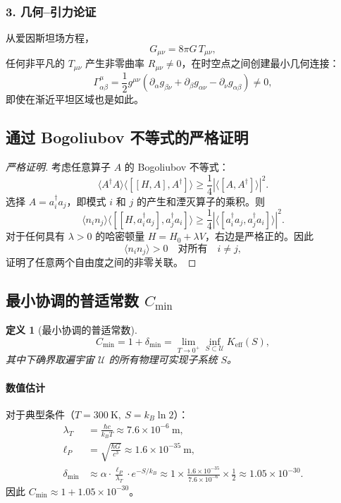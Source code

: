 \documentclass[11pt,a4paper]{article}
\newtheorem{definition}{定义}
\begin{document}
	\subsubsection*{3. 几何–引力论证}
	从爱因斯坦场方程，
	\[
	G_{\mu\nu} = 8\pi G \, T_{\mu\nu},
	\]
	任何非平凡的 \(T_{\mu\nu}\) 产生非零曲率 \(R_{\mu\nu} \neq 0\)，在时空点之间创建最小几何连接：
	\[
	\Gamma^{\mu}_{\alpha\beta} = \frac{1}{2} g^{\mu\nu}(\partial_\alpha g_{\beta\nu}
	+ \partial_\beta g_{\alpha\nu} - \partial_\nu g_{\alpha\beta}) \neq 0,
	\]
	即使在渐近平坦区域也是如此。
	
	\subsection{通过 Bogoliubov 不等式的严格证明}
	
	\begin{proof}[严格证明]
		考虑任意算子 \(A\) 的 Bogoliubov 不等式：
		\[
		\langle A^\dagger A \rangle \langle [[H, A], A^\dagger] \rangle
		\geq \frac{1}{4} |\langle [A, A^\dagger] \rangle|^2.
		\]
		选择 \(A = a_i^\dagger a_j\)，即模式 \(i\) 和 \(j\) 的产生和湮灭算子的乘积。则
		\[
		\langle n_i n_j \rangle \langle [[H, a_i^\dagger a_j], a_j^\dagger a_i] \rangle
		\geq \frac{1}{4} |\langle [a_i^\dagger a_j, a_j^\dagger a_i] \rangle|^2.
		\]
		对于任何具有 \(\lambda > 0\) 的哈密顿量 \(H = H_0 + \lambda V\)，右边是严格正的。因此
		\[
		\langle n_i n_j \rangle > 0 \quad \text{对所有} \quad i \neq j,
		\]
		证明了任意两个自由度之间的非零关联。
	\end{proof}
	
	\subsection{最小协调的普适常数 \(C_{\min}\)}
	
	\begin{definition}[最小协调的普适常数]
		\[
		C_{\min} = 1 + \delta_{\min} = \lim_{T \to 0^+} \inf_{S \subset \mathcal{U}} K_{\mathrm{eff}}(S),
		\]
		其中下确界取遍宇宙 \(\mathcal{U}\) 的所有物理可实现子系统 \(S\)。
	\end{definition}
	
	\paragraph{数值估计}
	对于典型条件（\(T = 300\ \mathrm{K},\ S = k_B \ln 2\)）：
	\begin{align*}
		\lambda_T &= \frac{\hbar c}{k_B T} \approx 7.6 \times 10^{-6}\ \mathrm{m},\\[2pt]
		\ell_P &= \sqrt{\frac{\hbar G}{c^3}} \approx 1.6 \times 10^{-35}\ \mathrm{m},\\[2pt]
		\delta_{\min} &\approx \alpha \cdot \frac{\ell_P}{\lambda_T} \cdot e^{-S/k_B}
		\approx 1 \times \frac{1.6 \times 10^{-35}}{7.6 \times 10^{-6}} \times \frac{1}{2}
		\approx 1.05 \times 10^{-30}.
	\end{align*}
	因此 \(C_{\min} \approx 1 + 1.05 \times 10^{-30}\)。
	
\end{document}
